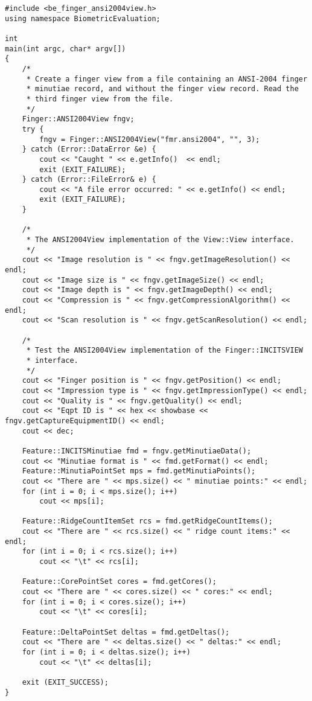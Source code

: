 \lstset{language=c++}
\begin{lstlisting}[caption={INCITS Finger Views}, label=incitsfingerviewuse]
#include <be_finger_ansi2004view.h>
using namespace BiometricEvaluation;

int
main(int argc, char* argv[])
{
    /*
     * Create a finger view from a file containing an ANSI-2004 finger
     * minutiae record, and without the finger view record. Read the
     * third finger view from the file.
     */
    Finger::ANSI2004View fngv;
    try {
        fngv = Finger::ANSI2004View("fmr.ansi2004", "", 3);
    } catch (Error::DataError &e) {
        cout << "Caught " << e.getInfo()  << endl;
        exit (EXIT_FAILURE);
    } catch (Error::FileError& e) {
        cout << "A file error occurred: " << e.getInfo() << endl;
        exit (EXIT_FAILURE);
    }

    /*
     * The ANSI2004View implementation of the View::View interface.
     */
    cout << "Image resolution is " << fngv.getImageResolution() << endl;
    cout << "Image size is " << fngv.getImageSize() << endl;
    cout << "Image depth is " << fngv.getImageDepth() << endl;
    cout << "Compression is " << fngv.getCompressionAlgorithm() << endl;
    cout << "Scan resolution is " << fngv.getScanResolution() << endl;

    /*
     * Test the ANSI2004View implementation of the Finger::INCITSVIEW
     * interface.
     */
    cout << "Finger position is " << fngv.getPosition() << endl;
    cout << "Impression type is " << fngv.getImpressionType() << endl;
    cout << "Quality is " << fngv.getQuality() << endl;
    cout << "Eqpt ID is " << hex << showbase << fngv.getCaptureEquipmentID() << endl;
    cout << dec;

    Feature::INCITSMinutiae fmd = fngv.getMinutiaeData();
    cout << "Minutiae format is " << fmd.getFormat() << endl;
    Feature::MinutiaPointSet mps = fmd.getMinutiaPoints();
    cout << "There are " << mps.size() << " minutiae points:" << endl;
    for (int i = 0; i < mps.size(); i++)
        cout << mps[i];

    Feature::RidgeCountItemSet rcs = fmd.getRidgeCountItems();
    cout << "There are " << rcs.size() << " ridge count items:" << endl;
    for (int i = 0; i < rcs.size(); i++)
        cout << "\t" << rcs[i];

    Feature::CorePointSet cores = fmd.getCores();
    cout << "There are " << cores.size() << " cores:" << endl;
    for (int i = 0; i < cores.size(); i++)
        cout << "\t" << cores[i];

    Feature::DeltaPointSet deltas = fmd.getDeltas();
    cout << "There are " << deltas.size() << " deltas:" << endl;
    for (int i = 0; i < deltas.size(); i++)
        cout << "\t" << deltas[i];

    exit (EXIT_SUCCESS);
}
\end{lstlisting}
